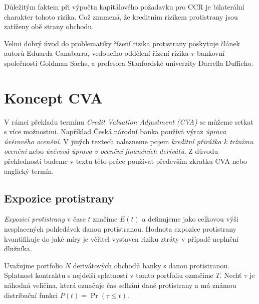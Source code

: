 \documentclass[a4paper,12pt]{report}
\theoremstyle{definition} \newtheorem{definice}[veta]{Definice}
\theoremstyle{remark}
\begin{document}
Důležitým faktem při výpočtu kapitálového požadavku pro CCR je  bilaterální charakter tohoto rizika. Což znamená, že kreditním rizikem protistrany jsou zatíženy obě strany obchodu.

Velmi dobrý úvod do problematiky řízení rizika protistrany poskytuje článek \cite{canabarro2003measuring} autorů Eduarda Canabarra, vedoucího oddělení řízení rizika v bankovní společnosti Goldman Sachs, a profesora Stanfordské univerzity Darrella Duffieho.

\section{Koncept CVA}
V rámci překladu termínu \textit{Credit Valuation Adjustment (CVA)}  se můžeme setkat s více možnostmi.
Například Česká národní banka používá výraz \textit{úprava úvěrového ocenění}.
V jiných textech nalezneme pojem  \textit{kreditní přirážka k tržnímu ocenění} nebo \textit{úvěrová úprava v ocenění finančních derivátů}.
Z důvodu přehlednosti budeme v textu této práce používat především zkratku CVA nebo anglický termín.

\subsection{Expozice protistrany}
\textit{Expozici protistrany} v čase $t$ značíme $E(t)$ a definujeme jako celkovou výši nesplacených pohledávek danou protistranou.
Hodnota expozice protistrany kvantifikuje do jaké míry je věřitel vystaven riziku ztráty v případě neplnění dlužníka.

Uvažujme portfolio $N$ derivátových obchodů banky s danou protistranou.
Splatnost kontraktu s nejdelší splatností v tomto portfoliu označíme $T$. 
Nechť $\tau$ je náhodná veličina, která označuje čas selhání dané protistrany a má známou distribuční funkci $P(t)=\Pr(\tau\leq t)$.
\end{document}
